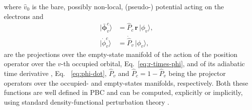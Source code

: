 where  $\hat v_0$ is the bare, possibly non-local, (pseudo-) potential acting on the electrons and
\begin{align}
  |\bm{\bar \phi}_v^c\rangle &= \hat P_c \,\mathbf{r}  \,|\phi_v \rangle, \label{eq:r-times-phi} \\
  |\dot \phi_v^c\rangle &= \dot{\hat P}_v \,|\phi_v\rangle, \label{eq:phi-dot}
\end{align}
are the projections over the empty-state manifold of the action of the position operator over the $v$-th occupied orbital, Eq.~\eqref{eq:r-times-phi}, and of its adiabatic time derivative \citep{Giannozzi2017}, Eq.~ \eqref{eq:phi-dot}, $\hat P_v$ and $\hat P_c = 1 - \hat P_v$ being the projector operators over the occupied- and empty-states manifolds, respectively. Both these functions are well defined in PBC and can be computed, explicitly or implicitly, using standard density-functional perturbation theory \citep{Baroni2001}.
